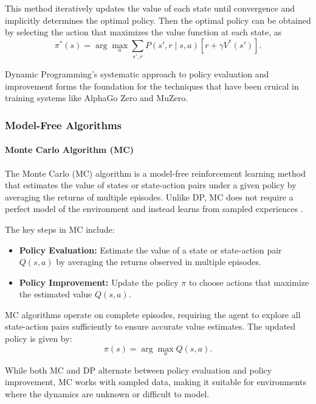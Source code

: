 This method iteratively updates the value of each state until convergence and
implicitly determines the optimal policy. Then the optimal policy can be
obtained by selecting the action that maximizes the value function at each
state, as
\begin{equation}
    \pi^*(s) = \arg\max_a \sum_{s', r} P(s', r \mid s, a) \left[ r + \gamma V^*(s') \right].
\end{equation}

Dynamic Programming's systematic approach to policy evaluation and improvement
forms the foundation for the techniques that have been cruical in training
systems like AlphaGo Zero and MuZero\cite{bg2}.

\subsubsection{\textbf{Model-Free Algorithms}}

\paragraph{Monte Carlo Algorithm (MC)}
The Monte Carlo (MC) algorithm is a model-free reinforcement learning method
that estimates the value of states or state-action pairs under a given policy
by averaging the returns of multiple episodes. Unlike DP, MC does not require a
perfect model of the environment and instead learns from sampled experiences \cite{bg2}.

The key steps in MC include:

\begin{itemize}
    \item \textbf{Policy Evaluation:} Estimate the value of a state or state-action pair \( Q(s, a) \) by averaging the returns observed in multiple episodes.
    \item \textbf{Policy Improvement:} Update the policy \( \pi \) to choose actions that maximize the estimated value \( Q(s, a) \).
\end{itemize}

MC algorithms operate on complete episodes, requiring the agent to explore all
state-action pairs sufficiently to ensure accurate value estimates. The updated
policy is given by:
\begin{equation}
    \pi(s) = \arg\max_a Q(s, a).
\end{equation}

While both MC and DP alternate between policy evaluation and policy
improvement, MC works with sampled data, making it suitable for environments
where the dynamics are unknown or difficult to model.

